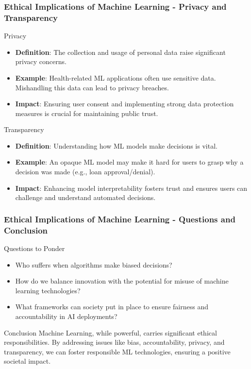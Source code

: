 \documentclass[aspectratio=169]{beamer}
\begin{document}
\begin{frame}[fragile]
  \frametitle{Ethical Implications of Machine Learning - Privacy and Transparency}
  \begin{block}{Privacy}
    \begin{itemize}
      \item \textbf{Definition}: The collection and usage of personal data raise significant privacy concerns.
      \item \textbf{Example}: Health-related ML applications often use sensitive data. Mishandling this data can lead to privacy breaches.
      \item \textbf{Impact}: Ensuring user consent and implementing strong data protection measures is crucial for maintaining public trust.
    \end{itemize}
  \end{block}

  \begin{block}{Transparency}
    \begin{itemize}
      \item \textbf{Definition}: Understanding how ML models make decisions is vital.
      \item \textbf{Example}: An opaque ML model may make it hard for users to grasp why a decision was made (e.g., loan approval/denial).
      \item \textbf{Impact}: Enhancing model interpretability fosters trust and ensures users can challenge and understand automated decisions.
    \end{itemize}
  \end{block}
\end{frame}

\begin{frame}[fragile]
  \frametitle{Ethical Implications of Machine Learning - Questions and Conclusion}
  \begin{block}{Questions to Ponder}
    \begin{itemize}
      \item Who suffers when algorithms make biased decisions?
      \item How do we balance innovation with the potential for misuse of machine learning technologies?
      \item What frameworks can society put in place to ensure fairness and accountability in AI deployments?
    \end{itemize}
  \end{block}

  \begin{block}{Conclusion}
    Machine Learning, while powerful, carries significant ethical responsibilities. By addressing issues like bias, accountability, privacy, and transparency, we can foster responsible ML technologies, ensuring a positive societal impact.
  \end{block}
\end{frame}
\end{document}
